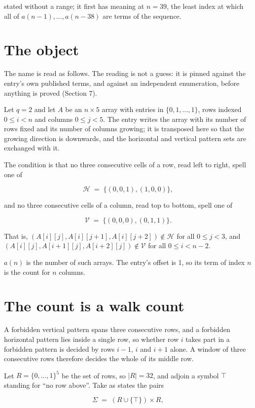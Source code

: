 \documentclass[11pt]{article}
\theoremstyle{definition}
\begin{document}
stated without a range; it first has meaning at $n = 39$, the least index at which all of $a(n-1),\dots,a(n-38)$ are terms of the sequence.

\section{The object}

The name is read as follows. The reading is not a guess: it is pinned against the entry's own published terms, and against an independent enumeration, before anything is proved (Section 7).

Let $q = 2$ and let $A$ be an $n \times 5$ array with entries in $\{0,1,\dots,1\}$, rows indexed $0 \le i < n$ and columns $0 \le j < 5$. The entry writes the array with its number of rows fixed and its number of columns growing; it is transposed here so that the growing direction is downwards, and the horizontal and vertical pattern sets are exchanged with it.

The condition is that no three consecutive cells of a row, read left to right, spell one of

\[\mathcal{H} \;=\; \{(0,0,1), (1,0,0)\},\]

and no three consecutive cells of a column, read top to bottom, spell one of

\[\mathcal{V} \;=\; \{(0,0,0), (0,1,1)\}.\]

That is, $(A[i][j],A[i][j{+}1],A[i][j{+}2]) \notin \mathcal{H}$ for all $0 \le j < 3$, and $(A[i][j],A[i{+}1][j],A[i{+}2][j]) \notin \mathcal{V}$ for all $0 \le i < n-2$.

$a(n)$ is the number of such arrays. The entry's offset is 1, so its term of index $n$ is the count for $n$ columns.

\section{The count is a walk count}

A forbidden vertical pattern spans three consecutive rows, and a forbidden horizontal pattern lies inside a single row, so whether row $i$ takes part in a forbidden pattern is decided by rows $i-1$, $i$ and $i+1$ alone. A window of three consecutive rows therefore decides the whole of its middle row.

Let $R = \{0,\dots,1\}^{5}$ be the set of rows, so $|R| = 32$, and adjoin a symbol $\top$ standing for ``no row above''. Take as states the pairs

\[\Sigma \;=\; (R \cup \{\top\}) \times R,\]
\end{document}

